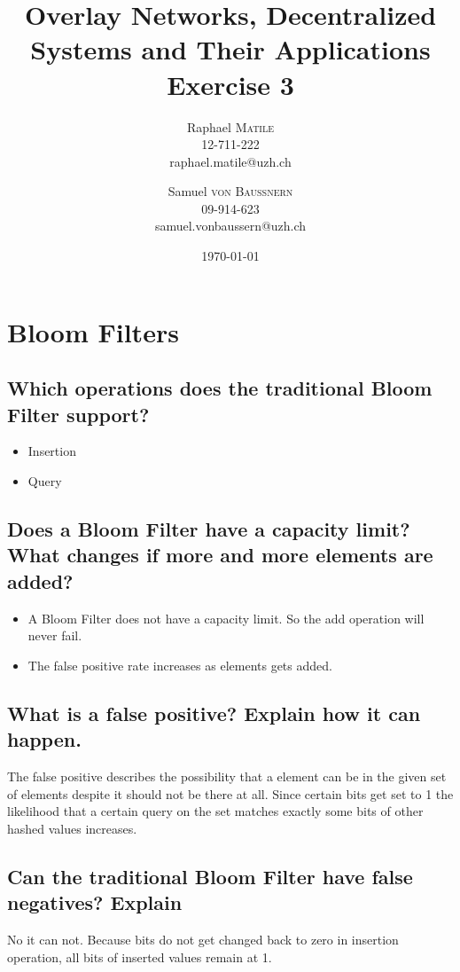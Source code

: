 \documentclass{article}
\title{Overlay Networks, Decentralized Systems and Their Applications
\\Exercise 3}
\author{Raphael \textsc{Matile}\\12-711-222\\raphael.matile@uzh.ch
\and Samuel \textsc{von Baussnern}\\09-914-623\\samuel.vonbaussern@uzh.ch}
\date{\today} %
\begin{document}
\maketitle %

\section{Bloom Filters}

\subsection{Which operations does the traditional Bloom Filter support?}

  \begin{itemize}
    \item Insertion
    \item Query
  \end{itemize}

\subsection{Does a Bloom Filter have a capacity limit? What changes if more and more elements are added?}

  \begin{itemize}
    \item A Bloom Filter does not have a capacity limit. So the add operation will never fail.
    \item The false positive rate increases as elements gets added.
  \end{itemize}

\subsection{What is a false positive? Explain how it can happen.}

  The false positive describes the possibility that a element can be in the given 
  set of elements despite it should not be there at all. 
  Since certain bits get set to 1 the likelihood that a certain query on the set 
  matches exactly some bits of other hashed values increases.

\subsection{Can the traditional Bloom Filter have false negatives? Explain}

  No it can not. Because bits do not get changed back to zero in insertion
  operation, all bits of inserted values remain at 1.
\end{document}
